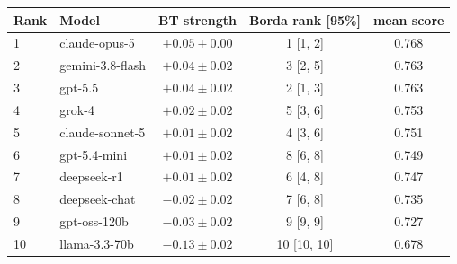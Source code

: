 \begin{tabular}{llccc}
\toprule
Rank & Model & BT strength & Borda rank [95\%] & mean score \\
\midrule
1 & claude-opus-5 & $+0.05 \pm 0.00$ & 1 [1, 2] & 0.768 \\
2 & gemini-3.8-flash & $+0.04 \pm 0.02$ & 3 [2, 5] & 0.763 \\
3 & gpt-5.5 & $+0.04 \pm 0.02$ & 2 [1, 3] & 0.763 \\
4 & grok-4 & $+0.02 \pm 0.02$ & 5 [3, 6] & 0.753 \\
5 & claude-sonnet-5 & $+0.01 \pm 0.02$ & 4 [3, 6] & 0.751 \\
6 & gpt-5.4-mini & $+0.01 \pm 0.02$ & 8 [6, 8] & 0.749 \\
7 & deepseek-r1 & $+0.01 \pm 0.02$ & 6 [4, 8] & 0.747 \\
8 & deepseek-chat & $-0.02 \pm 0.02$ & 7 [6, 8] & 0.735 \\
9 & gpt-oss-120b & $-0.03 \pm 0.02$ & 9 [9, 9] & 0.727 \\
10 & llama-3.3-70b & $-0.13 \pm 0.02$ & 10 [10, 10] & 0.678 \\
\bottomrule
\end{tabular}
